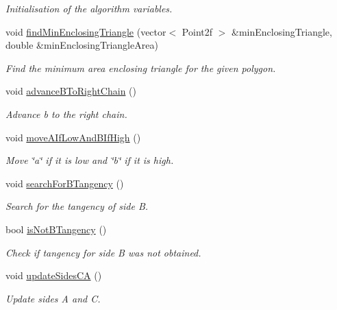 \begin{DoxyCompactItemize}
\begin{DoxyCompactList}\small\item\em Initialisation of the algorithm variables. \end{DoxyCompactList}\item 
void \hyperlink{classmultiscale_1_1MinEnclosingTriangleFinder_afe968e24fdc374841baa8fe21a6d8270}{find\-Min\-Enclosing\-Triangle} (vector$<$ Point2f $>$ \&min\-Enclosing\-Triangle, double \&min\-Enclosing\-Triangle\-Area)
\begin{DoxyCompactList}\small\item\em Find the minimum area enclosing triangle for the given polygon. \end{DoxyCompactList}\item 
void \hyperlink{classmultiscale_1_1MinEnclosingTriangleFinder_a55faab1deabea3b838490a4a3b62cafc}{advance\-B\-To\-Right\-Chain} ()
\begin{DoxyCompactList}\small\item\em Advance b to the right chain. \end{DoxyCompactList}\item 
void \hyperlink{classmultiscale_1_1MinEnclosingTriangleFinder_a88ca299e33ef6104513bd153501d5530}{move\-A\-If\-Low\-And\-B\-If\-High} ()
\begin{DoxyCompactList}\small\item\em Move \char`\"{}a\char`\"{} if it is low and \char`\"{}b\char`\"{} if it is high. \end{DoxyCompactList}\item 
void \hyperlink{classmultiscale_1_1MinEnclosingTriangleFinder_a7064b538e01622880b6a044e84d3ad0e}{search\-For\-B\-Tangency} ()
\begin{DoxyCompactList}\small\item\em Search for the tangency of side B. \end{DoxyCompactList}\item 
bool \hyperlink{classmultiscale_1_1MinEnclosingTriangleFinder_a9f071f42dbaff51c8975da1b77c1188e}{is\-Not\-B\-Tangency} ()
\begin{DoxyCompactList}\small\item\em Check if tangency for side B was not obtained. \end{DoxyCompactList}\item 
void \hyperlink{classmultiscale_1_1MinEnclosingTriangleFinder_a0f4a9131f5118fa0afc33344bdf67f16}{update\-Sides\-C\-A} ()
\begin{DoxyCompactList}\small\item\em Update sides A and C. \end{DoxyCompactList}\item 

\end{DoxyCompactItemize}
